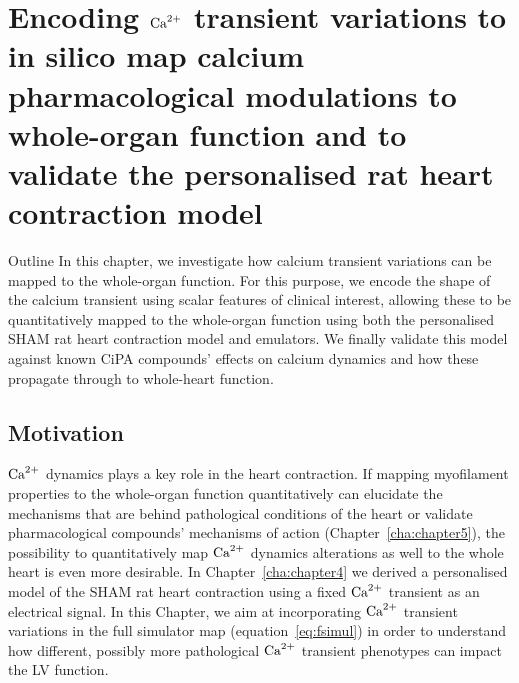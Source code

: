 \chapter{Encoding $\textrm{Ca}^{2+}$ transient variations to in silico map calcium pharmacological modulations to whole-organ function and to validate the personalised rat heart contraction model}\label{cha:chapter6}
%
%
%
\begin{remark}{Outline}
    In this chapter, we investigate how calcium transient variations can be mapped to the whole-organ function. For this purpose, we encode the shape of the calcium transient using scalar features of clinical interest, allowing these to be quantitatively mapped to the whole-organ function using both the personalised SHAM rat heart contraction model and emulators. We finally validate this model against known CiPA compounds' effects on calcium dynamics and how these propagate through to whole-heart function.
\end{remark}


%
%
%
\section{Motivation}\label{sec:ch6motivation}
$\textrm{Ca}^{2+}$ dynamics plays a key role in the heart contraction. If mapping myofilament properties to the whole-organ function quantitatively can elucidate the mechanisms that are behind pathological conditions of the heart or validate pharmacological compounds' mechanisms of action (Chapter~\ref{cha:chapter5}), the possibility to quantitatively map $\textrm{Ca}^{2+}$ dynamics alterations as well to the whole heart is even more desirable. In Chapter~\ref{cha:chapter4} we derived a personalised model of the SHAM rat heart contraction using a fixed $\textrm{Ca}^{2+}$ transient as an electrical signal. In this Chapter, we aim at incorporating $\textrm{Ca}^{2+}$ transient variations in the full simulator map (equation~\ref{eq:fsimul}) in order to understand how different, possibly more pathological $\textrm{Ca}^{2+}$ transient phenotypes can impact the LV function.



%
%
%
